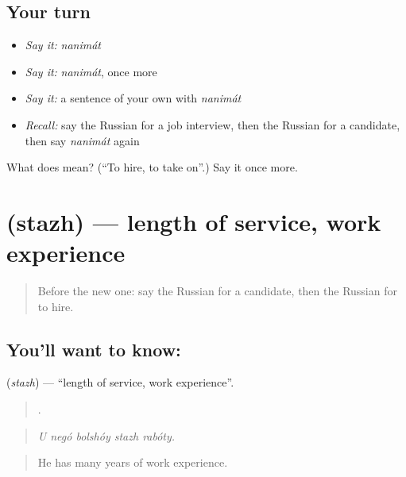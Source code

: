 \subsection*{Your turn}
\begin{itemize}
\raggedright
  \item \emph{Say it:} \emph{nanimát}
  \item \emph{Say it:} \emph{nanimát}, once more
  \item \emph{Say it:} a sentence of your own with \emph{nanimát}
  \item \emph{Recall:} say the Russian for a job interview, then the Russian for a candidate, then say \emph{nanimát} again
\end{itemize}

\begin{tcolorbox}[breakable,colback=teal!4,colframe=teal!35!black,title={Before you move on}]
What does  mean? (\textquotedblleft{}To hire, to take on\textquotedblright{}.) Say it once more.
\end{tcolorbox}
\section[\texorpdfstring{\ru{стаж} (stazh)}{стаж (stazh)}]{ (stazh) — length of service, work experience}

\label{lesson:RU-C358-stazh}



\begin{quote}
Before the new one: say the Russian for a candidate, then the Russian for to hire.
\end{quote}

\subsection*{You'll want to know: }
\textbf{} (\emph{stazh}) — \textquotedblleft{}length of service, work experience\textquotedblright{}.

\begin{quote}
    .
\end{quote}

\begin{quote}
\emph{U negó bolshóy stazh rabóty.}
\end{quote}

\begin{quote}
He has many years of work experience.
\end{quote}

